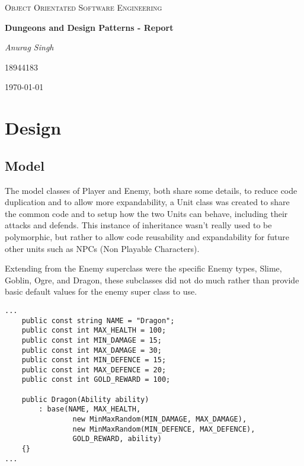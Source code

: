 \documentclass[12pt,titlepage]{article}
\begin{document}
\hypersetup{pageanchor=false}
\begin{titlepage}
    \centering
    \vfill
    \vspace{1cm}
    {\scshape\Large Object Orientated Software Engineering\par}
    \vfill
    {\huge\bfseries Dungeons and Design Patterns - Report\par}
    \vspace{2cm}
    {\Large\itshape Anurag Singh\par}
    {\Large 18944183\par}
    \vfill
    {\large \today\par}
\end{titlepage}

\tableofcontents
\newpage
{}

\hypersetup{pageanchor=true}

\section{Design}
\subsection{Model}
The model classes of Player and Enemy, both share some details, to reduce code duplication and to allow more expandability, a Unit class was created to share the common code and to setup how the two Units can behave, including their attacks and defends. This instance of inheritance wasn't really used to be polymorphic, but rather to allow code reusability and expandability for future other units such as NPCs (Non Playable Characters).

Extending from the Enemy superclass were the specific Enemy types, Slime, Goblin, Ogre, and Dragon, these subclasses did not do much rather than provide basic default values for the enemy super class to use.

\begin{verbatim}
...
    public const string NAME = "Dragon";
    public const int MAX_HEALTH = 100;
    public const int MIN_DAMAGE = 15;
    public const int MAX_DAMAGE = 30;
    public const int MIN_DEFENCE = 15;
    public const int MAX_DEFENCE = 20;
    public const int GOLD_REWARD = 100;

    public Dragon(Ability ability)
        : base(NAME, MAX_HEALTH,
                new MinMaxRandom(MIN_DAMAGE, MAX_DAMAGE),
                new MinMaxRandom(MIN_DEFENCE, MAX_DEFENCE),
                GOLD_REWARD, ability)
    {}
...
\end{verbatim}
\end{document}
